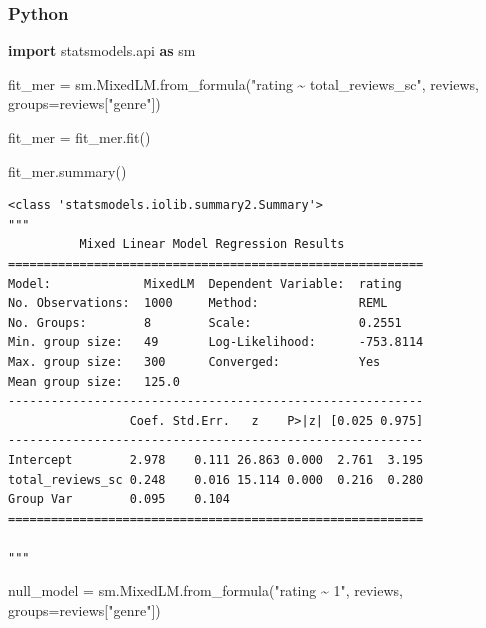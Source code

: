 \documentclass[
  letterpaper,
]{krantz}
\newenvironment{Shaded}{}{}
\newcommand{\ImportTok}[1]{\textcolor[rgb]{0.00,0.50,0.00}{\textbf{#1}}}
\newcommand{\NormalTok}[1]{#1}
\newcommand{\OperatorTok}[1]{\textcolor[rgb]{0.40,0.40,0.40}{#1}}
\newcommand{\StringTok}[1]{\textcolor[rgb]{0.25,0.44,0.63}{#1}}
\begin{document}
\subsubsection{Python}

\begin{Shaded}
\begin{Highlighting}[]
\ImportTok{import}\NormalTok{ statsmodels.api }\ImportTok{as}\NormalTok{ sm}

\NormalTok{fit\_mer }\OperatorTok{=}\NormalTok{ sm.MixedLM.from\_formula(}\StringTok{"rating \textasciitilde{} total\_reviews\_sc"}\NormalTok{, reviews, }
\NormalTok{                                  groups}\OperatorTok{=}\NormalTok{reviews[}\StringTok{"genre"}\NormalTok{])}

\NormalTok{fit\_mer }\OperatorTok{=}\NormalTok{ fit\_mer.fit()}

\NormalTok{fit\_mer.summary()}
\end{Highlighting}
\end{Shaded}

\begin{verbatim}
<class 'statsmodels.iolib.summary2.Summary'>
"""
          Mixed Linear Model Regression Results
==========================================================
Model:             MixedLM  Dependent Variable:  rating   
No. Observations:  1000     Method:              REML     
No. Groups:        8        Scale:               0.2551   
Min. group size:   49       Log-Likelihood:      -753.8114
Max. group size:   300      Converged:           Yes      
Mean group size:   125.0                                  
----------------------------------------------------------
                 Coef. Std.Err.   z    P>|z| [0.025 0.975]
----------------------------------------------------------
Intercept        2.978    0.111 26.863 0.000  2.761  3.195
total_reviews_sc 0.248    0.016 15.114 0.000  0.216  0.280
Group Var        0.095    0.104                           
==========================================================

"""
\end{verbatim}

\begin{Shaded}
\begin{Highlighting}[]

\NormalTok{null\_model }\OperatorTok{=}\NormalTok{ sm.MixedLM.from\_formula(}\StringTok{"rating \textasciitilde{} 1"}\NormalTok{, reviews, }
\NormalTok{                                     groups}\OperatorTok{=}\NormalTok{reviews[}\StringTok{"genre"}\NormalTok{])}
\end{Highlighting}
\end{Shaded}
\end{document}
